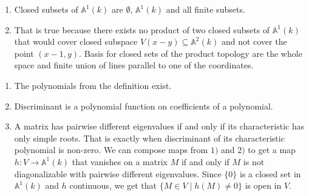 \newcommand{\sheet}{1}




\maketitle

\begin{exercise}{1}
    \begin{enumerate}
        \item{} Closed subsets of $\mathbb{A}^1(k)$ are $\emptyset$,
            $\mathbb{A}^1(k)$ and all finite subsets.
        \item{} That is true because there exists no product of two closed subsets
            of $\mathbb{A}^1(k)$ that would cover closed subspace $V(x - y)
            \subseteq \mathbb{A}^2(k)$ and not cover the point $(x - 1, y)$.
            Basis for closed sets of the product topology are the whole space
            and finite union of lines parallel to one of the coordinates.
    \end{enumerate}
\end{exercise}

\begin{exercise}{2}
    \begin{enumerate}
        \item The polynomials from the definition exist.
        \item Discriminant is a polynomial function on coefficients of a
            polynomial.
        \item A matrix has pairwise different eigenvalues if and only if its
            characteristic has only simple roots. That is exactly when
            discriminant of its characteristic polynomial is non-zero. We can
            compose maps from $1)$ and $2)$ to get a map $h \colon V \rightarrow
            \mathbb{A}^1(k)$ that vanishes on a matrix $M$ if and only if $M$ is
            not diagonalizable with pairwise different eigenvalues. Since
            $\{0\}$ is a closed set in $\mathbb{A}^1(k)$ and $h$ continuous, we
            get that $\{ M \in V \mid h(M) \not= 0 \}$ is open in $V$.
    \end{enumerate}
\end{exercise}

